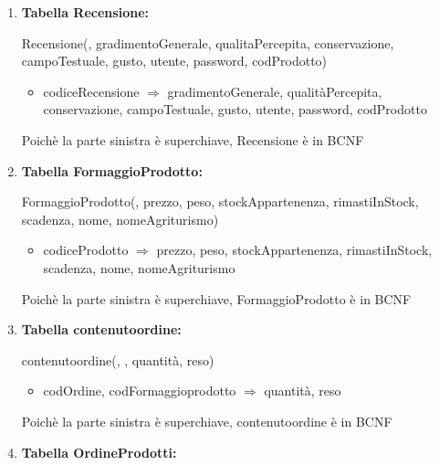 \documentclass[12pt,a4paper]{article}
\begin{document}
\begin{enumerate}
\item[] \textbf{Tabella Recensione:}

Recensione(\underline{}, gradimentoGenerale, qualitaPercepita, conservazione, campoTestuale, gusto, utente,  password,  codProdotto)
\begin{itemize}
\vspace{-5pt}
\item codiceRecensione $\Rightarrow$ gradimentoGenerale, qualitàPercepita, conservazione, campoTestuale, gusto, utente, password, codProdotto
\vspace{-5pt}
\end{itemize}
Poichè la parte sinistra è superchiave, Recensione è in BCNF
\vspace{10pt}



\item[] \textbf{Tabella FormaggioProdotto:}

FormaggioProdotto(\underline{}, prezzo, peso, stockAppartenenza, rimastiInStock, scadenza,  nome,  nomeAgriturismo)
\begin{itemize}
\vspace{-5pt}
\item codiceProdotto $\Rightarrow$ prezzo, peso, stockAppartenenza, rimastiInStock, scadenza, nome, nomeAgriturismo
\vspace{-5pt}
\end{itemize}
Poichè la parte sinistra è superchiave, FormaggioProdotto è in BCNF
\vspace{10pt}



\item[] \textbf{Tabella contenutoordine:}

contenutoordine(\underline{}, \underline{}, quantità, reso)
\begin{itemize}
\vspace{-5pt}
\item codOrdine, codFormaggioprodotto $\Rightarrow$ quantità, reso
\vspace{-5pt}
\end{itemize}
Poichè la parte sinistra è superchiave, contenutoordine è in BCNF
\vspace{10pt}



\item[] \textbf{Tabella OrdineProdotti:}


\end{enumerate}
\end{document}
